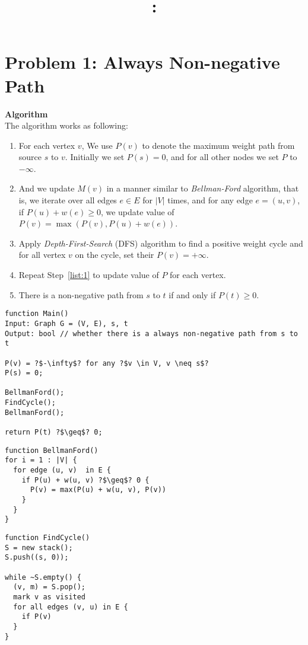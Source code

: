 \documentclass{article}
\title{\textmd{\bf \Class: \Title}}
\date{}
\author{\textbf{\StudentName}}
\newcommand{\Algorithm}{\textbf{Algorithm} \vspace{0.2cm}\\}
\begin{document}
\maketitle \thispagestyle{empty}
\section*{Problem 1: Always Non-negative Path}
\Algorithm
The algorithm works as following:
\begin{enumerate}
  \item For each vertex $v$, We use $P(v)$ to denote the maximum weight path from source $s$ to $v$.
  Initially we set $P(s) = 0$, and for all other nodes we set $P$ to $-\infty$. 
\item  \label{list:1} And we update $M(v)$
    in a manner similar to \textit{Bellman-Ford} algorithm, that is, we iterate over all edges $e \in E$
    for $|V|$ times, and for any edge $e = (u, v)$, if $P(u) + w(e) \geq 0$, we update value of $P(v) =
    \max(P(v), P(u) + w(e))$.
  \item Apply \textit{Depth-First-Search} (DFS) algorithm to find a positive weight cycle and for
    all vertex $v$ on the cycle, set their $P(v) = +\infty$.
  \item Repeat Step~\ref{list:1} to update value of $P$ for each vertex.
  \item There is a non-negative path from $s$ to $t$ if and only if $P(t) \geq 0$.  
\end{enumerate}


\begin{verbatim}
function Main()
Input: Graph G = (V, E), s, t
Output: bool // whether there is a always non-negative path from s to t

P(v) = ?$-\infty$? for any ?$v \in V, v \neq s$?
P(s) = 0;

BellmanFord();
FindCycle();
BellmanFord();

return P(t) ?$\geq$? 0;
\end{verbatim}


\begin{verbatim}
function BellmanFord()
for i = 1 : |V| {
  for edge (u, v)  in E {
    if P(u) + w(u, v) ?$\geq$? 0 {
      P(v) = max(P(u) + w(u, v), P(v)) 
    }
  }
}

\end{verbatim}

\begin{verbatim}
function FindCycle()
S = new stack();
S.push((s, 0));

while ~S.empty() {
  (v, m) = S.pop();
  mark v as visited
  for all edges (v, u) in E {
    if P(v)
  }
}

\end{verbatim}
\end{document}
